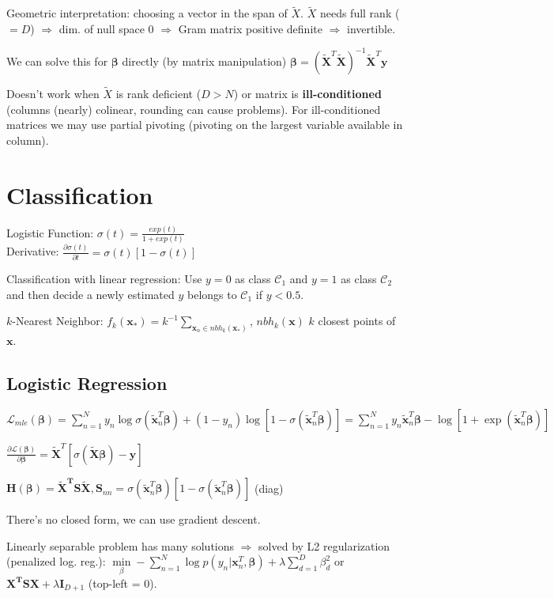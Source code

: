 \documentclass[10pt,a4paper,landscape]{article}
\renewcommand{\bf}[1]{\ensuremath{\mathbf{#1}}}
\newcommand{\bbeta}{\boldsymbol\beta}
\begin{document}
\begin{multicols*}{4}
Geometric interpretation: choosing a vector in the span of $\tilde{X}$. $\tilde{X}$ needs full rank ($=D$) $\Rightarrow$ dim. of null space 0 $\Rightarrow$ Gram matrix positive definite $\Rightarrow$ invertible.

We can solve this for $\bbeta$ directly (by matrix manipulation)
$\bbeta = ( \bf{\tilde{X}}^T \bf{\tilde{X}} )^{-1} \bf{\tilde{X}}^T \bf{y}$

Doesn't work when $\tilde{X}$ is rank deficient ($D>N$) or matrix is \textbf{ill-conditioned} (columns (nearly) colinear, rounding can cause problems). For ill-conditioned matrices we may use partial pivoting (pivoting on the largest variable available in column).

\section{Classification}
Logistic Function: $\sigma(t) = \frac{exp(t)}{1+exp(t)}$\\
Derivative: $\frac{ \partial\sigma(t) }{ \partial t } = \sigma(t)[ 1 - \sigma(t) ]$

Classification with linear regression: Use $y = 0$ as class $\mathcal{C}_1$
and $y = 1$ as class $\mathcal{C}_2$ and then decide a newly estimated $y$ belongs
to $\mathcal{C}_1$ if $y < 0.5$.

$k$-Nearest Neighbor: $f_k(\bf{x}_*) = k^{-1} \sum_{\bf{x}_n \in nbh_k (\bf{x}_*)}$, $nbh_k (\bf{x})$ $k$ closest points of $\bf{x}$.

\subsection{Logistic Regression}
$\mathcal{L}_{mle}(\bbeta) = \sum\limits_{n=1}^N y_n \log \sigma(\tilde{\bf{x}}_n^T \bbeta) + (1-y_n) \log[1-\sigma(\tilde{\bf{x}}_n^T \bbeta)]
= \sum\limits_{n=1}^N y_n \tilde{\bf{x}}_n^T \bbeta - \log[1 + \exp(\tilde{\bf{x}}_n^T \bbeta)]$

$\frac{ \partial\mathcal{L}(\bbeta) }{ \partial \bbeta } = \tilde{\bf{X}}^T [\sigma(\tilde{\bf{X}} \bbeta) - \bf{y}]$

$\bf{H}(\bbeta) = \bf{\tilde{X}^T S \tilde{X}}, \bf{S}_{nn} = \sigma(\bf{\tilde{x}}_n^T \bbeta) [1 - \sigma(\bf{\tilde{x}}_n^T \bbeta)]$ (diag)

There's no closed form, we can use gradient descent.

Linearly separable problem has many solutions $\Rightarrow$ solved by L2 regularization (penalized log. reg.): $\min\limits_\beta -\sum\limits_{n=1}^N \log p(y_n | \bf{x}_n^T, \bbeta) + \lambda \sum\limits_{d=1}^D\beta^2_d$ or $\bf{X^T S X} + \lambda \bf{I}_{D+1}$ (top-left = 0).


\end{multicols*}
\end{document}
